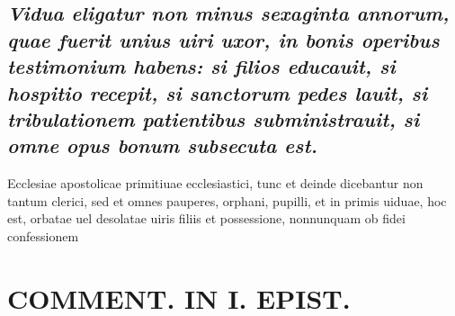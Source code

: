 \documentclass{article}
\begin{document}
\begin{pages}
\subsection*{\textit{Vidua eligatur non minus sexaginta annorum, quae fuerit unius uiri uxor, in bonis operibus testimonium habens: si filios educauit, si hospitio recepit, si sanctorum pedes lauit, si tribulationem patientibus subministrauit, si omne opus bonum subsecuta est. }}\pstart Ecclesiae apostolicae primitiuae ecclesiastici, tunc et deinde dicebantur non tantum clerici, sed et omnes pauperes, orphani, pupilli, et in primis uiduae, hoc est, orbatae uel desolatae uiris filiis et possessione, nonnunquam ob fidei confessionem  \pend
\section*{COMMENT. IN I. EPIST. }

\end{pages}
\end{document}
